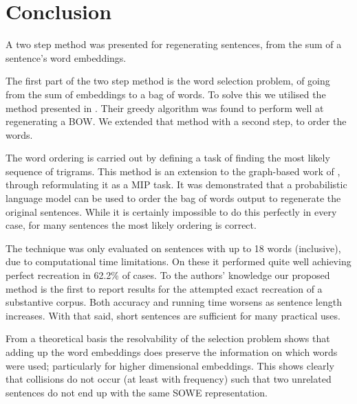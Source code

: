 \documentclass[11pt]{article}
\theoremstyle{plain}
\theoremstyle{definition}
\newcommand{\textcite}{\protect\newcite}
\begin{document}
\section{Conclusion} \label{conclusion}
A two step method was presented for regenerating sentences, from the sum of a sentence's word embeddings. 

The first part of the two step method is  the word selection problem, of going from the sum of embeddings to a bag of words. To solve this we utilised the method presented in \textcite{White2015BOWgen}. Their greedy algorithm was found to perform well at regenerating a BOW. We extended that method with a second step, to order the words.

The word ordering is carried out by defining a task of finding the most likely sequence of trigrams. This method is an extension to the graph-based work of \textcite{Horvat2014}, through reformulating it as a MIP task. It was demonstrated that a probabilistic language model can be used to order the bag of words output to regenerate the original sentences. While it is certainly impossible to do this perfectly in every case, for many sentences the most likely ordering is correct.

The technique was only evaluated on sentences with up to 18 words (inclusive), due to computational time limitations. On these it performed quite well achieving perfect recreation in 62.2\% of cases. To the authors' knowledge our proposed method is the first to report results for the attempted exact recreation of a substantive corpus. Both accuracy and running time worsens as sentence length increases. With that said, short sentences are sufficient for many practical uses.

From a theoretical basis the resolvability of the selection problem shows that adding up the word embeddings does preserve the information on which words were used; particularly for higher dimensional embeddings. This shows clearly that collisions do not occur (at least with frequency) such that two unrelated sentences do not end up with the same SOWE representation. 



\end{document}
